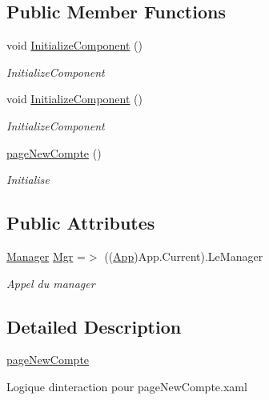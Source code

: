 \subsection*{Public Member Functions}
\begin{DoxyCompactItemize}
\item 
void \hyperlink{classnewPizza1_1_1pageNewCompte_a7469fdce60a25c385ac5b019b57a492a}{Initialize\+Component} ()
\begin{DoxyCompactList}\small\item\em Initialize\+Component \end{DoxyCompactList}\item 
void \hyperlink{classnewPizza1_1_1pageNewCompte_a7469fdce60a25c385ac5b019b57a492a}{Initialize\+Component} ()
\begin{DoxyCompactList}\small\item\em Initialize\+Component \end{DoxyCompactList}\item 
\hyperlink{classnewPizza1_1_1pageNewCompte_a482900bbedd1cfe0f7c2288a061699f9}{page\+New\+Compte} ()
\begin{DoxyCompactList}\small\item\em Initialise \end{DoxyCompactList}\end{DoxyCompactItemize}
\subsection*{Public Attributes}
\begin{DoxyCompactItemize}
\item 
\hyperlink{classModele_1_1Manager}{Manager} \hyperlink{classnewPizza1_1_1pageNewCompte_aba54899728264680a38671ccf9b5dffb}{Mgr} =$>$ ((\hyperlink{classnewPizza1_1_1App}{App})App.\+Current).Le\+Manager
\begin{DoxyCompactList}\small\item\em Appel du manager \end{DoxyCompactList}\end{DoxyCompactItemize}


\subsection{Detailed Description}
\hyperlink{classnewPizza1_1_1pageNewCompte}{page\+New\+Compte} 

Logique d\textquotesingle{}interaction pour page\+New\+Compte.\+xaml 

